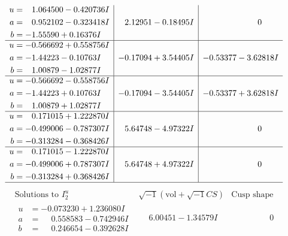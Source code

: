 \documentclass[1p]{elsarticle_modified}
\theoremstyle{definition}
\newcommand{\I}{\sqrt{-1}}
\begin{document}
$$\begin{array}{c|c|c}
\begin{aligned}
u &= \phantom{-}1.064500 - 0.420736 I \\
a &= \phantom{-}0.952102 - 0.323418 I \\
b &= -1.55590 + 0.16376 I\end{aligned}
 & \phantom{-}2.12951 - 0.18495 I & \phantom{-0.000000 } 0 \\ \hline\begin{aligned}
u &= -0.566692 + 0.558756 I \\
a &= -1.44223 - 0.10763 I \\
b &= \phantom{-}1.00879 - 1.02877 I\end{aligned}
 & -0.17094 + 3.54405 I & -0.53377 - 3.62818 I \\ \hline\begin{aligned}
u &= -0.566692 - 0.558756 I \\
a &= -1.44223 + 0.10763 I \\
b &= \phantom{-}1.00879 + 1.02877 I\end{aligned}
 & -0.17094 - 3.54405 I & -0.53377 + 3.62818 I \\ \hline\begin{aligned}
u &= \phantom{-}0.171015 + 1.222870 I \\
a &= -0.499006 - 0.787307 I \\
b &= -0.313284 - 0.368426 I\end{aligned}
 & \phantom{-}5.64748 - 4.97322 I & \phantom{-0.000000 } 0 \\ \hline\begin{aligned}
u &= \phantom{-}0.171015 - 1.222870 I \\
a &= -0.499006 + 0.787307 I \\
b &= -0.313284 + 0.368426 I\end{aligned}
 & \phantom{-}5.64748 + 4.97322 I & \phantom{-0.000000 } 0\\
 \hline 
 \end{array}$$\newpage$$\begin{array}{c|c|c}  
\text{Solutions to }I^u_{2}& \I (\text{vol} + \sqrt{-1}CS) & \text{Cusp shape}\\
 \hline 
\begin{aligned}
u &= -0.073230 + 1.236080 I \\
a &= \phantom{-}0.558583 - 0.742946 I \\
b &= \phantom{-}0.246654 - 0.392628 I\end{aligned}
 & \phantom{-}6.00451 - 1.34579 I & \phantom{-0.000000 } 0 \\ \hline\begin{aligned}

\end{aligned}
\end{array}$$
\end{document}
